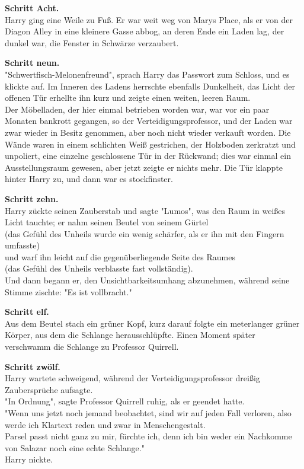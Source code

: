 {\textbf{Schritt Acht.}\\ Harry ging eine Weile zu Fuß. Er war weit weg von Marys Place, als er von der Diagon Alley in eine kleinere Gasse abbog, an deren Ende ein Laden lag, der dunkel war, die Fenster in Schwärze verzaubert.

\textbf{Schritt neun.}\\ "Schwertfisch-Melonenfreund", sprach Harry das Passwort zum Schloss, und es klickte auf. Im Inneren des Ladens herrschte ebenfalls Dunkelheit, das Licht der offenen Tür erhellte ihn kurz und zeigte einen weiten, leeren Raum.\\ Der Möbelladen, der hier einmal betrieben worden war, war vor ein paar Monaten bankrott gegangen, so der Verteidigungsprofessor, und der Laden war zwar wieder in Besitz genommen, aber noch nicht wieder verkauft worden. Die Wände waren in einem schlichten Weiß gestrichen, der Holzboden zerkratzt und unpoliert, eine einzelne geschlossene Tür in der Rückwand; dies war einmal ein Ausstellungsraum gewesen, aber jetzt zeigte er nichts mehr. Die Tür klappte hinter Harry zu, und dann war es stockfinster.

\textbf{Schritt zehn.}\\ Harry zückte seinen Zauberstab und sagte "Lumos", was den Raum in weißes Licht tauchte; er nahm seinen Beutel von seinem Gürtel\\ (das Gefühl des Unheils wurde ein wenig schärfer, als er ihn mit den Fingern umfasste)\\ und warf ihn leicht auf die gegenüberliegende Seite des Raumes\\ (das Gefühl des Unheils verblasste fast vollständig).\\ Und dann begann er, den Unsichtbarkeitsumhang abzunehmen, während seine Stimme zischte: "Es ist vollbracht."

\textbf{Schritt elf.}\\ Aus dem Beutel stach ein grüner Kopf, kurz darauf folgte ein meterlanger grüner Körper, aus dem die Schlange herausschlüpfte. Einen Moment später verschwamm die Schlange zu Professor Quirrell.

\textbf{Schritt zwölf.}\\ Harry wartete schweigend, während der Verteidigungsprofessor dreißig Zaubersprüche aufsagte.\\ "In Ordnung", sagte Professor Quirrell ruhig, als er geendet hatte.\\ "Wenn uns jetzt noch jemand beobachtet, sind wir auf jeden Fall verloren, also werde ich Klartext reden und zwar in Menschengestalt.\\ Parsel passt nicht ganz zu mir, fürchte ich, denn ich bin weder ein Nachkomme von Salazar noch eine echte Schlange."\\ Harry nickte.

}
